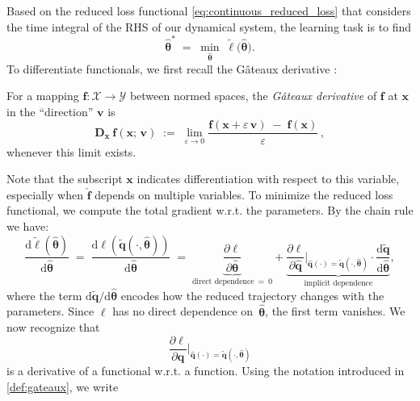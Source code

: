 Based on the reduced loss functional \eqref{eq:continuous_reduced_loss} that considers the time integral of the RHS of our dynamical system, the learning task is to find\\
\begin{equation}
  \hat{\bm{\theta}}^*
  \;=\;
  \min_{\hat{\bm{\theta}}}\;
  \tilde{\ell}\bigl(\hat{\bm{\theta}}\bigr).
\end{equation}
To differentiate functionals, we first recall the Gâteaux derivative \cite{bonnans2013perturbation}:\\
\begin{definition}\label{def:gateaux}
    For a mapping $\mathbf{f}: \mathcal{X}\to\mathcal{Y}$ between normed spaces, the \emph{Gâteaux derivative} of $\mathbf{f}$ at $\mathbf{x}$ in the “direction” $\mathbf{v}$ is\\
    $$\bm{D}_{\mathbf{x}}~\mathbf{f}(\mathbf{x};\,\mathbf{v})
  \;:=\;
  \lim_{\varepsilon\to0}
    \frac{\mathbf{f}(\mathbf{x} + \varepsilon\,\mathbf{v})
           \;-\;\mathbf{f}(\mathbf{x})}
         {\varepsilon}\,,$$
    whenever this limit exists.
\end{definition}
Note that the subscript $\mathbf{x}$ indicates differentiation with respect to this variable, especially when $\hat{\mathbf{f}}$ depends on multiple variables.
To minimize the reduced loss functional, we compute the total gradient w.r.t. the parameters. By the chain rule we have:\\
\begin{equation}
  \frac{\mathrm{d}\tilde{\ell}(\hat{\bm{\theta}})}{\mathrm{d}\hat{\bm{\theta}}}
  \;=\; \frac{\mathrm{d}{\ell}(\tilde{\mathbf{q}}(\cdot,\hat{\bm{\theta}}))}{\mathrm{d}\hat{\bm{\theta}}}\;=\;
  \underbrace{\frac{\partial \ell}{\partial \hat{\bm{\theta}}}}_{\text{direct dependence} ~=~0}
  + 
  \underbrace{\frac{\partial \ell}{\partial \hat{\mathbf{q}}}\Bigg\vert_{\hat{\mathbf{q}}(\cdot) = \tilde{\mathbf{q}}(\cdot, \hat{\bm{\theta}} )}\cdot
                \frac{\mathrm{d} \tilde{\mathbf{q}}}{\mathrm{d} \hat{\bm{\theta}}}
               }_{\text{implicit dependence}},
    \label{eq:l_gradient}
\end{equation}
where the term $\mathrm{d} \tilde{\mathbf{q}}/\mathrm{d} \hat{\bm{\theta}}$ encodes how the reduced trajectory changes with the parameters. Since $\ell$ has no direct dependence on~$\hat{\bm{\theta}}$, the first term vanishes. We now recognize that\\ 
$$\frac{\partial \ell}{\partial \hat{\mathbf{q}}}\Bigg\vert_{\hat{\mathbf{q}}(\cdot)=\tilde{\mathbf{q}}(\cdot, \hat{\bm{\theta}})}$$ is a derivative of a functional w.r.t. a function. Using the notation introduced in \ref{def:gateaux}, we write\\
